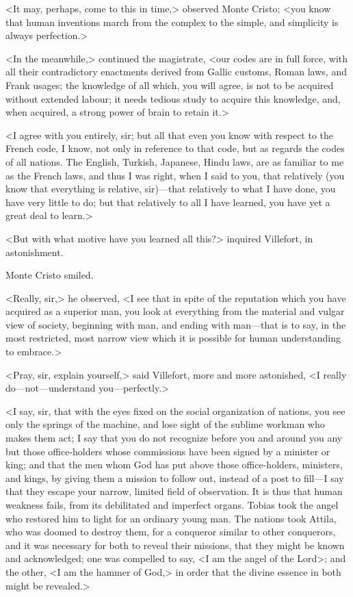  <It may, perhaps, come to this in time,> observed Monte Cristo; <you know that human inventions march from the complex to the simple, and simplicity is always perfection.> 

 <In the meanwhile,> continued the magistrate, <our codes are in full force, with all their contradictory enactments derived from Gallic customs, Roman laws, and Frank usages; the knowledge of all which, you will agree, is not to be acquired without extended labour; it needs tedious study to acquire this knowledge, and, when acquired, a strong power of brain to retain it.> 

 <I agree with you entirely, sir; but all that even you know with respect to the French code, I know, not only in reference to that code, but as regards the codes of all nations. The English, Turkish, Japanese, Hindu laws, are as familiar to me as the French laws, and thus I was right, when I said to you, that relatively (you know that everything is relative, sir)—that relatively to what I have done, you have very little to do; but that relatively to all I have learned, you have yet a great deal to learn.> 

 <But with what motive have you learned all this?> inquired Villefort, in astonishment. 

 Monte Cristo smiled. 

 <Really, sir,> he observed, <I see that in spite of the reputation which you have acquired as a superior man, you look at everything from the material and vulgar view of society, beginning with man, and ending with man—that is to say, in the most restricted, most narrow view which it is possible for human understanding to embrace.> 

 <Pray, sir, explain yourself,> said Villefort, more and more astonished, <I really do—not—understand you—perfectly.> 

 <I say, sir, that with the eyes fixed on the social organization of nations, you see only the springs of the machine, and lose sight of the sublime workman who makes them act; I say that you do not recognize before you and around you any but those office-holders whose commissions have been signed by a minister or king; and that the men whom God has put above those office-holders, ministers, and kings, by giving them a mission to follow out, instead of a post to fill—I say that they escape your narrow, limited field of observation. It is thus that human weakness fails, from its debilitated and imperfect organs. Tobias took the angel who restored him to light for an ordinary young man. The nations took Attila, who was doomed to destroy them, for a conqueror similar to other conquerors, and it was necessary for both to reveal their missions, that they might be known and acknowledged; one was compelled to say, <I am the angel of the Lord>; and the other, <I am the hammer of God,> in order that the divine essence in both might be revealed.> 


